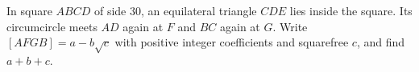 In square $ABCD$ of side 30, an equilateral triangle $CDE$ lies inside the square. Its circumcircle meets $AD$ again at $F$ and $BC$ again at $G$. Write $[AFGB]=a-b\sqrt c$ with positive integer coefficients and squarefree $c$, and find $a+b+c$.
